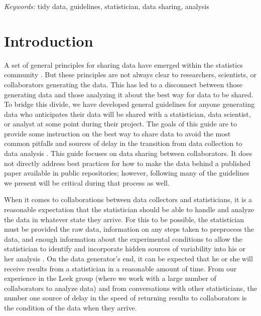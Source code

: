 \documentclass[12pt]{article}
\begin{document}
\noindent%
{\it Keywords:} tidy data, guidelines, statistician, data sharing, analysis
\vfill

\newpage
{} %

\section{Introduction}\label{introduction}

A set of general principles for sharing data have emerged within the
statistics community
\citep[\citet{_tidy_data},\citet{wilson_good_2016},\citet{white_nine_2013}]{woo_browman}.
But these principles are not always clear to researchers, scientists, or
collaborators generating the data. This has led to a disconnect between
those generating data and those analyzing it about the best way for data
to be shared. To bridge this divide, we have developed general
guidelines for anyone generating data who anticipates their data will be
shared with a statistician, data scientist, or analyst at some point
during their project. The goals of this guide are to provide some
instruction on the best way to share data to avoid the most common
pitfalls and sources of delay in the transition from data collection to
data analysis \citep{leek2015opinion}. This guide focuses on data
sharing between collaborators. It does not directly address best
practices for how to make the data behind a published paper available in
public repositories; however, following many of the guidelines we
present will be critical during that process as well.

When it comes to collaborations between data collectors and
statisticians, it is a reasonable expectation that the statistician
should be able to handle and analyze the data in whatever state they
arrive. For this to be possible, the statistician must be provided the
raw data, information on any steps taken to preprocess the data, and
enough information about the experimental conditions to allow the
statistician to identify and incorporate hidden sources of variability
into his or her analysis \citep{baggerly2010disclose}. On the data
generator's end, it can be expected that he or she will receive results
from a statistician in a reasonable amount of time. From our experience
in the Leek group \citep{_jtleek} (where we work with a large number of
collaborators to analyze data) and from conversations with other
statisticians, the number one source of delay in the speed of returning
results to collaborators is the condition of the data when they arrive.
\end{document}

